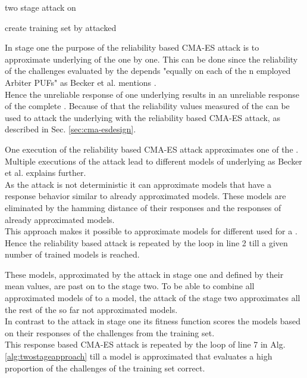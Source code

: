 \SetAlCapHSkip{0.2em}
\begin{algorithm}[H] %
\Indm
\SetAlgoLined
\caption{two stage attack on \xpufs}
\label{alg:twostageapproach}
\Indp

create training set by attacked \xpuf\\

\end{algorithm}

In stage one the purpose of the reliability based \ac{CMA-ES} attack is to approximate underlying \apufs of the \xpuf one by one.
This can be done since the reliability of the challenges evaluated by the \xpuf depends "equally on each of the n employed Arbiter PUFs" as Becker et al. mentions \cite{Becker2015ThePUFs}.\\
Hence the unreliable response of one underlying \apuf results in an unreliable response of the complete \puf.
Because of that the reliability values measured of the \xpuf can be used to attack the underlying \apufs with the reliability based \ac{CMA-ES} attack, as described in Sec. \ref{sec:cma-esdesign}.

One execution of the reliability based \ac{CMA-ES} attack approximates one of the \apufs.
Multiple executions of the attack lead to different models of underlying \apufs as Becker et al. explains further.\\
As the attack is not deterministic it can approximate models that have a response behavior similar to already approximated models.
These models are eliminated by the hamming distance of their responses and the responses of already approximated models.\\
This approach makes it possible to approximate models for different \apufs used for a \xpuf.
Hence the reliability based attack is repeated by the loop in line 2 till a given number of trained models is reached.

These models, approximated by the attack in stage one and defined by their mean values, are past on to the stage two.
To be able to combine all approximated models of \apuf to a \xpuf model, the attack of the stage two approximates all the rest of the so far not approximated models.\\
In contrast to the attack in stage one its fitness function scores the models based on their responses of the challenges from the training set.\\
This response based \ac{CMA-ES} attack is repeated by the loop of line 7 in Alg. \ref{alg:twostageapproach} till a model is approximated that evaluates a high proportion of the challenges of the training set correct.

